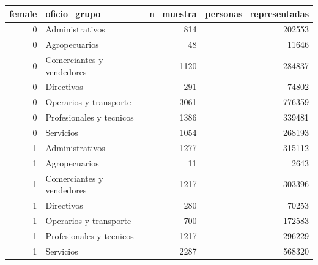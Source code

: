 \begin{tabular}{rlrr}
\toprule
female & oficio\_grupo & n\_muestra & personas\_representadas \\
\midrule
0 & Administrativos & 814 & 202553 \\
0 & Agropecuarios & 48 & 11646 \\
0 & Comerciantes y vendedores & 1120 & 284837 \\
0 & Directivos & 291 & 74802 \\
0 & Operarios y transporte & 3061 & 776359 \\
0 & Profesionales y tecnicos & 1386 & 339481 \\
0 & Servicios & 1054 & 268193 \\
1 & Administrativos & 1277 & 315112 \\
1 & Agropecuarios & 11 & 2643 \\
1 & Comerciantes y vendedores & 1217 & 303396 \\
1 & Directivos & 280 & 70253 \\
1 & Operarios y transporte & 700 & 172583 \\
1 & Profesionales y tecnicos & 1217 & 296229 \\
1 & Servicios & 2287 & 568320 \\
\bottomrule
\end{tabular}
